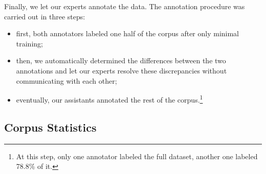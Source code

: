 
Finally, we let our experts annotate the data.  The annotation
procedure was carried out in three steps:
\begin{itemize}
  \item first, both annotators labeled one half of the corpus after
    only minimal training;
  \item then, we automatically determined the differences between the
    two annotations and let our experts resolve these discrepancies
    without communicating with each other;
  \item eventually, our assistants annotated the rest of the
    corpus.\footnote{At this step, only one annotator labeled the full
      dataset, another one labeled 78.8\% of it.}
\end{itemize}

\subsection{Corpus Statistics}\label{subsec:snt:stat}

